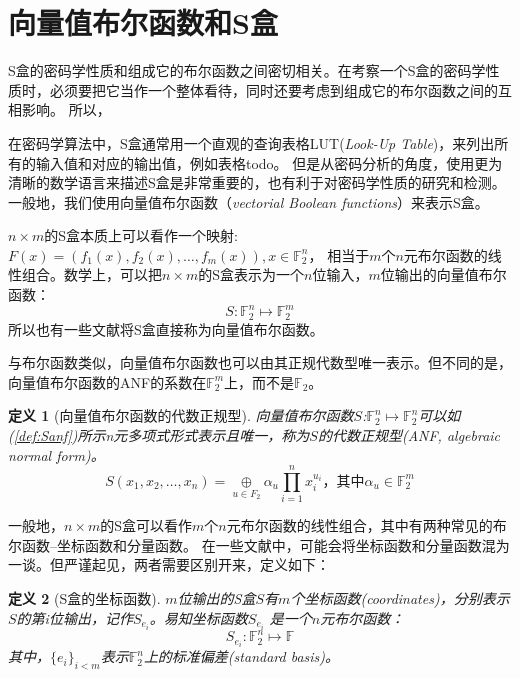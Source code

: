 \documentclass{xduugthesis}
\newtheorem{definition}{定义}
\begin{document}
\section{向量值布尔函数和S盒}
S盒的密码学性质和组成它的布尔函数之间密切相关。在考察一个S盒的密码学性质时，必须要把它当作一个整体看待，同时还要考虑到组成它的布尔函数之间的互相影响。
所以，\par
在密码学算法中，S盒通常用一个直观的查询表格LUT(\emph{Look-Up Table})，来列出所有的输入值和对应的输出值，例如表格todo。
但是从密码分析的角度，使用更为清晰的数学语言来描述S盒是非常重要的，也有利于对密码学性质的研究和检测。一般地，我们使用向量值布尔函数（\emph{vectorial Boolean functions}）来表示S盒。\par
$n\times m$的S盒本质上可以看作一个映射:$F(x) = (f_1(x), f_2(x),\dots , f_m(x)), x\in \mathbb{F}_2^n$，
相当于$m$个$n$元布尔函数的线性组合。数学上，可以把$n\times m$的S盒表示为一个$n$位输入，$m$位输出的向量值布尔函数：
$$
S:\mathbb{F}_2^n \mapsto \mathbb{F}_2^m
$$
所以也有一些文献将S盒直接称为向量值布尔函数。\par

与布尔函数类似，向量值布尔函数也可以由其正规代数型唯一表示。但不同的是，向量值布尔函数的ANF的系数在$\mathbb{F}_2^m$上，而不是$\mathbb{F}_2$。
\begin{definition}[向量值布尔函数的代数正规型]
    向量值布尔函数$S$:$\mathbb{F}_2^n \mapsto \mathbb{F}_2^n$可以如(\ref{def:Sanf})所示n元多项式形式表示且唯一，称为$S$的代数正规型(ANF, algebraic normal form)。
    \begin{equation}
        S(x_1,x_2,\dots ,x_n) = \mathop{\oplus}\limits_{u \in F_2}\alpha_u \prod\limits_{i=1}^n x_i^{u_i}\mbox{，其中}\alpha_u \in \mathbb{F}_2^m \label{def:Sanf}
    \end{equation}
\end{definition}\par

一般地，$n\times m$的S盒可以看作$m$个$n$元布尔函数的线性组合，其中有两种常见的布尔函数--坐标函数和分量函数。
在一些文献中，可能会将坐标函数和分量函数混为一谈。但严谨起见，两者需要区别开来，定义如下：\par
\begin{definition}[S盒的坐标函数]
    $m$位输出的S盒$S$有$m$个坐标函数(\emph{coordinates})，分别表示$S$的第i位输出，记作$S_{e_i}$。易知坐标函数$S_{e_i}$
    是一个$n$元布尔函数：
    $$
    S_{e_i}:\mathbb{F}_2^n \mapsto \mathbb{F}
    $$
    其中，$\{e_i\}_{i<m}$表示$\mathbb{F}_2^n$上的标准偏差(\emph{standard basis})。
\end{definition}\par
\end{document}
